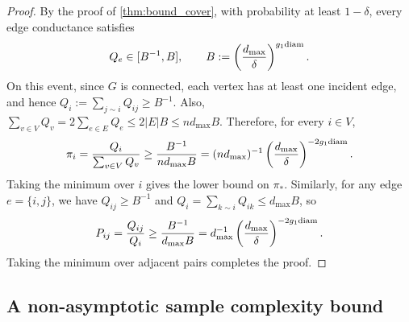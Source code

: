\documentclass[a4paper, 11pt]{article}
\newcommand{\diam}{\textnormal{diam}}
\begin{document}
\begin{proof}
  By the proof of \cref{thm:bound_cover}, with probability at least $1-\delta$, every edge conductance satisfies
  \[
    Q_e\in [B^{-1},B],
    \qquad
    B:=\left(\frac{d_{\max}}{\delta}\right)^{g_1\diam}.
  \]
  On this event, since $G$ is connected, each vertex has at least one incident edge, and hence $Q_i:=\sum_{j\sim i}Q_{ij}\ge B^{-1}$. Also, $\sum_{v\in V}Q_v=2\sum_{e\in E}Q_e\le 2|E|B\le nd_{\max}B$. Therefore, for every $i\in V$,
  \[
    \pi_i=\frac{Q_i}{\sum_{v\in V}Q_v}
    \ge
    \frac{B^{-1}}{nd_{\max}B}
    =
    (nd_{\max})^{-1}
    \left(\frac{d_{\max}}{\delta}\right)^{-2g_1\diam}.
  \]
  Taking the minimum over $i$ gives the lower bound on $\pi_*$. Similarly, for any edge $e=\{i,j\}$, we have $Q_{ij}\ge B^{-1}$ and $Q_i=\sum_{k\sim i}Q_{ik}\le d_{\max}B$, so
  \[
    P_{ij}=\frac{Q_{ij}}{Q_i}
    \ge
    \frac{B^{-1}}{d_{\max}B}
    =
    d_{\max}^{-1}
    \left(\frac{d_{\max}}{\delta}\right)^{-2g_1\diam}.
  \]
  Taking the minimum over adjacent pairs completes the proof.
\end{proof}



\subsection{A non-asymptotic sample complexity bound}
\end{document}
